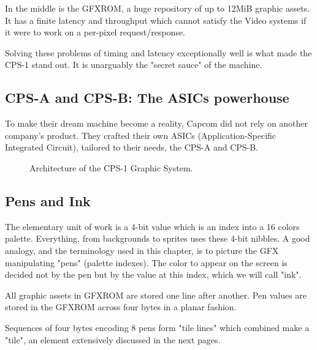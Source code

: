 In the middle is the GFXROM, a huge repository of up to 12MiB graphic assets. It has a finite latency and throughput which cannot satisfy the Video systems if it were to work on a per-pixel request/response.

Solving these problems of timing and latency exceptionally well is what made the CPS-1 stand out. It is unarguably the "secret sauce" of the machine. 

\subsection{CPS-A and CPS-B: The ASICs powerhouse}
To make their dream machine become a reality, Capcom did not rely on another company's product. They crafted their own ASICs (Application-Specific Integrated Circuit), tailored to their needs, the CPS-A and CPS-B.


\begin{figure}[H]
\caption*{Architecture of the CPS-1 Graphic System.}
\end{figure}




\subsection{Pens and Ink}
The elementary unit of work is a 4-bit value which is an index into a 16 colors palette. Everything, from backgrounds to sprites uses these 4-bit nibbles. A good analogy, and the terminology used in this chapter, is to picture the GFX manipulating "pens" (palette indexes). The color to appear on the screen is decided not by the pen but by the value at this index, which we will call "ink".


All graphic assets in GFXROM are stored one line after another. Pen values are stored in the GFXROM across four bytes in a planar fashion.






Sequences of four bytes encoding 8 pens form "tile lines" which combined make a "tile", an element extensively discussed in the next pages.

